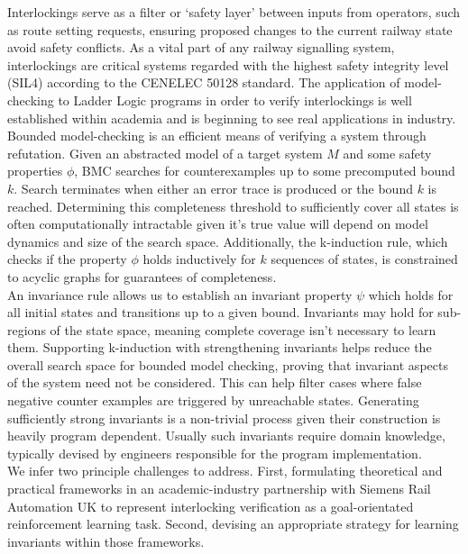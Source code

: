 \documentclass[runningheads]{llncs}
\begin{document}
Interlockings serve as a filter or ‘safety layer’ between inputs from operators, such as route setting requests, ensuring proposed changes to the current railway state avoid safety conflicts. As a vital part of any railway signalling system, interlockings are critical systems regarded with the highest safety integrity level
(SIL4) according to the CENELEC 50128 standard. The application of model-checking
to Ladder Logic programs in order to verify interlockings is well established within academia and is beginning to see real applications in industry.
Bounded model-checking is an efficient means of verifying a system through refutation. Given an abstracted model of a target system $M$ and some safety properties $\phi$, BMC searches for counterexamples up to some precomputed bound $k$. Search terminates when either an error trace is produced or the bound $k$ is reached. Determining this completeness threshold to sufficiently cover all states is often computationally intractable given it's true value will depend on model dynamics and size of the search space. Additionally, the k-induction rule, which checks if the property $\phi$ holds inductively for $k$ sequences of states, is constrained to acyclic graphs for guarantees of completeness. \\

An invariance rule allows us to establish an invariant property $\psi$ which holds for all initial states and transitions up to a given bound. Invariants may hold for sub-regions of the state space, meaning complete coverage isn't necessary to learn them. Supporting k-induction with strengthening invariants helps reduce the overall search space for bounded model checking, proving that invariant aspects of the system need not be considered. This can help filter cases where false negative counter examples are triggered by unreachable states. Generating sufficiently strong invariants is a non-trivial process given their construction is heavily program dependent. Usually such invariants require domain knowledge, typically devised by engineers responsible for the program implementation. \\

We infer two principle challenges to address. First, formulating theoretical and practical frameworks in an academic-industry partnership with Siemens Rail Automation UK to represent interlocking verification as a goal-orientated reinforcement learning task. Second, devising an appropriate strategy for learning invariants within those frameworks.\\
\end{document}

